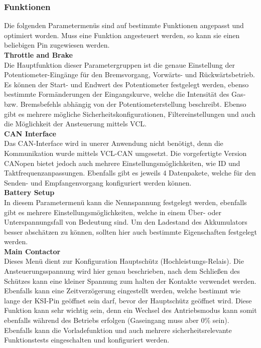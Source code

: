\subsubsection{Funktionen}
Die folgenden Parametermenüs sind auf bestimmte Funktionen angepasst und optimiert worden. Muss eine Funktion angesteuert werden, so kann sie einen beliebigen Pin zugewiesen werden.
\\[4mm] 

\textbf{Throttle and Brake}\\[1mm]
Die Hauptfunktion dieser Parametergruppen ist die genaue Einstellung der Potentiometer-Eingänge für den Bremsvorgang, Vorwärts- und Rückwärtsbetrieb. Es können der Start- und Endwert des Potentiometer festgelegt werden, ebenso bestimmte Formänderungen der Eingangskurve, welche die Intensität des Gas- bzw. Bremsbefehls abhängig von der Potentiometerstellung beschreibt. Ebenso gibt es mehrere mögliche Sicherheitskonfigurationen, Filtereinstellungen und auch die Möglichkeit der Ansteuerung mittels VCL.\\[4mm]

\textbf{CAN Interface}\\[1mm]
Das CAN-Interface wird in unerer Anwendung nicht benötigt, denn die Kommunikation wurde mittels VCL-CAN umgesetzt. Die vorgefertigte Version CANopen bietet jedoch auch mehrere Einstellungsmöglichkeiten, wie ID und Taktfrequenzanpassungen. Ebenfalls gibt es jeweils 4 Datenpakete, welche für den Senden- und Empfangenvorgang konfiguriert werden können.
\\[4mm]

\textbf{Battery Setup}\\[1mm]
In diesem Parametermenü kann die Nennspannung festgelegt werden, ebenfalls gibt es mehrere Einstellungsmöglichkeiten, welche in einem Über- oder Unterspannungsfall von Bedeutung sind. Um den Ladestand des Akkumulators besser abschätzen zu können, sollten hier auch bestimmte Eigenschaften festgelegt werden.
\\[4mm]

\textbf{Main Contactor}\\[1mm]
Dieses Menü dient zur Konfiguration Hauptschütz (Hochleistungs-Relais). Die Ansteuerungsspannung wird hier genau beschrieben, nach dem Schließen des Schützes kann eine kleiner Spannung zum halten der Kontakte verwendet werden. Ebenfalls kann eine Zeitverzögerung eingestellt werden, welche bestimmt wie lange der KSI-Pin geöffnet sein darf, bevor der Hauptschütz geöffnet wird. Diese Funktion kann sehr wichtig sein, denn ein Wechsel des Antriebsmodus kann somit ebenfalls während des Betriebs erfolgen (Gaseingang muss aber 0\% sein). Ebenfalls kann die Vorladefunktion und auch mehrere sicherheitsrelevante Funktionstests eingeschalten und konfiguriert werden.
\\[4mm]

